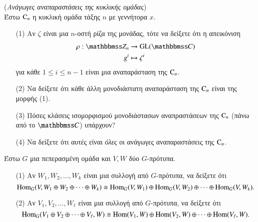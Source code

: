 \documentclass[12pt,a4paper,reqno]{amsart}
\begin{document}
\begin{exercise}{(\textit{Ανάγωγες αναπαραστάσεις της κυκλικής ομάδας})}
    \\
    Έστω $\mathrm{C}_n$ η κυκλική ομάδα τάξης $n$ με γεννήτορα $x$.
    \begin{itemize}
        \item[(1)] Αν $\zeta$ είναι μια $n$-οστή ρίζα της μονάδας, τότε να δείξετε ότι η απεικόνιση
        \begin{align*}
            \rho : \ZZ_n &\to \GL(\CC) \\
            g^i &\mapsto \zeta^i
        \end{align*}
        για κάθε $1 \le i \le n-1$ είναι μια αναπαράσταση της $\mathrm{C}_n$.
        \item[(2)] Να δείξετε ότι κάθε άλλη μονοδιάστατη αναπαράσταση της $\mathrm{C}_n$ είναι της μορφής (1).
        \item[(3)] Πόσες κλάσεις ισομορφισμού μονοδιάστασων αναπραστάσεων της $\mathrm{C}_n$ (πάνω από το $\CC$) υπάρχουν?
        \item[(4)] Να δείξετε ότι αυτές είναι \emph{όλες} οι ανάγωγες αναπαραστάσεις της $\mathrm{C}_n$.
    \end{itemize}
\end{exercise}

\begin{exercise}
    Έστω $G$ μια πεπερασμένη ομάδα και $V, W$ δύο $G$-πρότυπα.
    \begin{itemize}
        \item[(1)] Αν $W_1, W_2, \dots, W_k$ είναι μια συλλογή από $G$-πρότυπα, να δείξετε ότι 
        \[
        \mathrm{Hom}_G(V,W_1 \oplus W_2 \oplus \cdots \oplus W_k) \cong 
        \mathrm{Hom}_G(V,W_1) \oplus \mathrm{Hom}_G(V,W_2) \oplus \cdots \oplus \mathrm{Hom}_G(V,W_k).
        \]
        \item[(2)] Αν $V_1, V_2, \dots, W_\ell$ είναι μια συλλογή από $G$-πρότυπα, να δείξετε ότι 
        \[
        \mathrm{Hom}_G(V_1 \oplus V_2 \oplus \cdots \oplus V_\ell,W) \cong 
        \mathrm{Hom}(V_1,W) \oplus \mathrm{Hom}(V_2,W) \oplus \cdots \oplus \mathrm{Hom}(V_\ell,W).
        \]
    \end{itemize}
\end{exercise}
\end{document}
